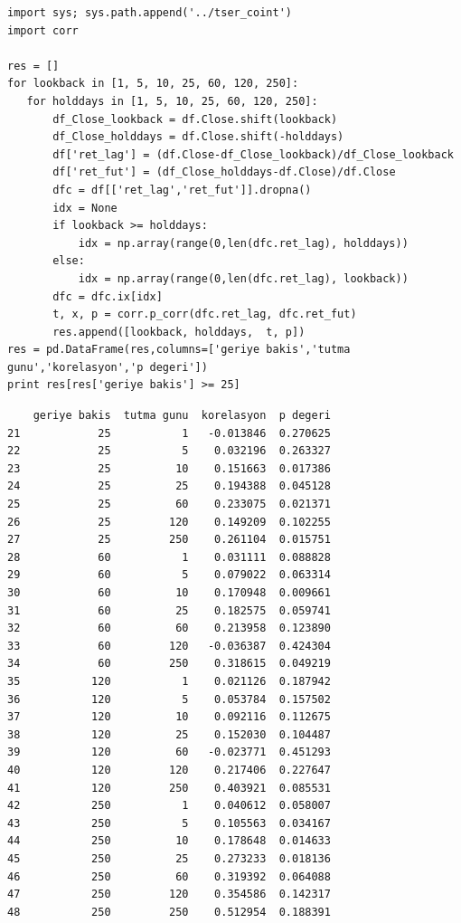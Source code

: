 \documentclass[12pt,fleqn]{article}\usepackage{../../common}
\begin{document}
\begin{verbatim}
import sys; sys.path.append('../tser_coint')
import corr

res = []
for lookback in [1, 5, 10, 25, 60, 120, 250]:
   for holddays in [1, 5, 10, 25, 60, 120, 250]:
       df_Close_lookback = df.Close.shift(lookback)
       df_Close_holddays = df.Close.shift(-holddays)
       df['ret_lag'] = (df.Close-df_Close_lookback)/df_Close_lookback
       df['ret_fut'] = (df_Close_holddays-df.Close)/df.Close
       dfc = df[['ret_lag','ret_fut']].dropna()
       idx = None
       if lookback >= holddays: 
           idx = np.array(range(0,len(dfc.ret_lag), holddays))
       else: 
           idx = np.array(range(0,len(dfc.ret_lag), lookback))
       dfc = dfc.ix[idx]
       t, x, p = corr.p_corr(dfc.ret_lag, dfc.ret_fut)
       res.append([lookback, holddays,  t, p])
res = pd.DataFrame(res,columns=['geriye bakis','tutma gunu','korelasyon','p degeri'])
print res[res['geriye bakis'] >= 25]
\end{verbatim}

\begin{verbatim}
    geriye bakis  tutma gunu  korelasyon  p degeri
21            25           1   -0.013846  0.270625
22            25           5    0.032196  0.263327
23            25          10    0.151663  0.017386
24            25          25    0.194388  0.045128
25            25          60    0.233075  0.021371
26            25         120    0.149209  0.102255
27            25         250    0.261104  0.015751
28            60           1    0.031111  0.088828
29            60           5    0.079022  0.063314
30            60          10    0.170948  0.009661
31            60          25    0.182575  0.059741
32            60          60    0.213958  0.123890
33            60         120   -0.036387  0.424304
34            60         250    0.318615  0.049219
35           120           1    0.021126  0.187942
36           120           5    0.053784  0.157502
37           120          10    0.092116  0.112675
38           120          25    0.152030  0.104487
39           120          60   -0.023771  0.451293
40           120         120    0.217406  0.227647
41           120         250    0.403921  0.085531
42           250           1    0.040612  0.058007
43           250           5    0.105563  0.034167
44           250          10    0.178648  0.014633
45           250          25    0.273233  0.018136
46           250          60    0.319392  0.064088
47           250         120    0.354586  0.142317
48           250         250    0.512954  0.188391
\end{verbatim}
\end{document}
